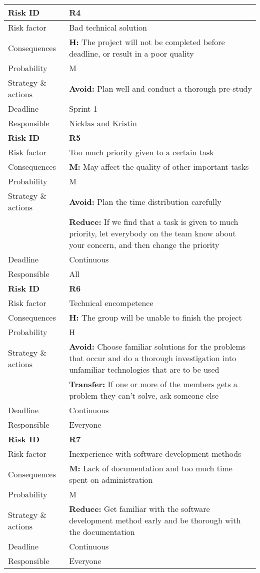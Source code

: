 \begin{longtable}{>{\setlength\hsize{.3\hsize}}X|>{\setlength\hsize{0.7\hsize}}X}
\textbf{Risk ID} & \textbf{R4} \\ \hline \hline
Risk factor & Bad technical solution                                                \\
Consequences & \textbf{H:} The project will not be completed before deadline, or result in a poor quality \\
Probability & M \\
Strategy \& actions & \textbf{Avoid:} Plan well and conduct a thorough pre-study \\
Deadline & Sprint 1 \\
Responsible & Nicklas and Kristin \\ \hline

\textbf{Risk ID} & \textbf{R5} \\ \hline \hline
Risk factor & Too much priority given to a certain task \\
Consequences & \textbf{M:} May affect the quality of other important tasks \\
Probability & M \\
Strategy \& actions & \textbf{Avoid:} Plan the time distribution carefully\\
 & \textbf{Reduce:} If we find that a task is given to much priority, let everybody on the team know about your concern, and then change the priority \\
Deadline & Continuous \\
Responsible & All \\ \hline

\newpage

\hline
\textbf{Risk ID} & \textbf{R6} \\ \hline \hline
Risk factor & Technical encompetence \\
Consequences & \textbf{H:} The group will be unable to finish the project \\
Probability & H \\
Strategy \& actions & \textbf{Avoid:} Choose familiar solutions for the problems that occur and do a thorough investigation into unfamiliar technologies that are to be used\\
 & \textbf{Transfer:} If one or more of the members gets a problem they can't solve, ask someone else \\
Deadline & Continuous \\
Responsible & Everyone \\ \hline

\textbf{Risk ID} & \textbf{R7} \\ \hline \hline
Risk factor & Inexperience with software development methods \\
Consequences & \textbf{M:} Lack of documentation and too much time spent on administration \\
Probability & M \\
Strategy \& actions & \textbf{Reduce:} Get familiar with the software development method early and be thorough with the documentation \\
Deadline & Continuous \\
Responsible & Everyone \\ \hline


\end{longtable}
